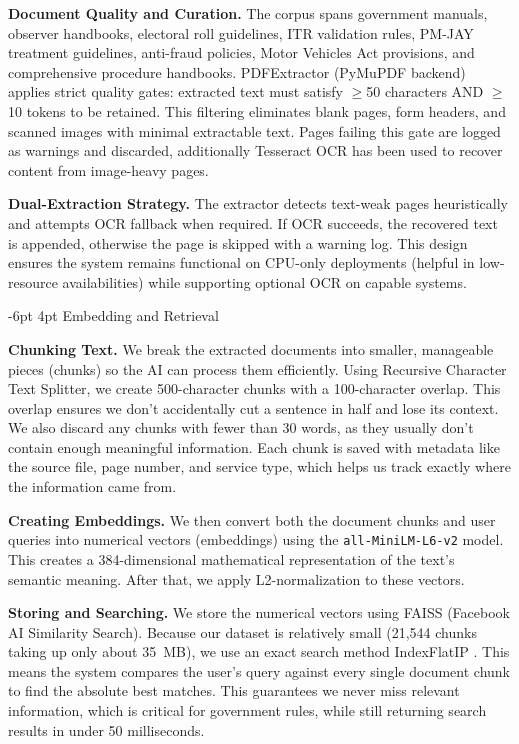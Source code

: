 \documentclass[10pt,twocolumn]{article}
\makeatletter
\renewcommand{\subsection}{\@startsection{subsection}{2}{\z@}%
  {-6pt \@plus -1pt \@minus -0.5pt}%
  {4pt \@plus 0.2pt}%
  {\normalfont\large\bfseries}}
\makeatother
\begin{document}
\noindent\textbf{Document Quality and Curation.}  The corpus spans government manuals, observer
handbooks, electoral roll guidelines, ITR validation rules, PM-JAY treatment guidelines, anti-fraud
policies, Motor Vehicles Act provisions, and comprehensive procedure handbooks. PDFExtractor
(PyMuPDF backend) applies strict quality gates: extracted text must satisfy $\geq$50 characters AND $\geq$10
tokens to be retained. This filtering eliminates blank pages, form headers, and scanned images with
minimal extractable text.  Pages failing this gate are logged as warnings and discarded, additionally Tesseract
OCR has been used to recover content from image-heavy pages.

\textbf{Dual-Extraction Strategy.}  The extractor detects text-weak pages heuristically and attempts
OCR fallback when required. If OCR succeeds, the
recovered text is appended, otherwise the page is skipped with a 
warning log. This design ensures the system remains functional on CPU-only deployments (helpful in low-resource
availabilities) while supporting optional OCR on capable systems.

\subsection{Embedding and Retrieval}

\textbf{Chunking Text.} We break the extracted documents into smaller, manageable pieces (chunks) so the AI can process them efficiently. Using Recursive Character Text Splitter, we create 500-character chunks with a 100-character overlap. This overlap ensures we don't accidentally cut a sentence in half and lose its context. We also discard any chunks with fewer than 30 words, as they usually don't contain enough meaningful information. Each chunk is saved with metadata like the source file, page number, and service type, which helps us track exactly where the information came from.

\textbf{Creating Embeddings.} We then convert both the document chunks and user queries into numerical vectors (embeddings) using the \texttt{all-MiniLM-L6-v2} model. This creates a 384-dimensional mathematical representation of the text's semantic meaning. After that, we apply L2-normalization to these vectors. 

\textbf{Storing and Searching.} We store the numerical vectors using FAISS (Facebook AI Similarity Search). Because our dataset is relatively small (21,544 chunks taking up only about 35~MB), we use an exact search method IndexFlatIP . This means the system compares the user's query against every single document chunk to find the absolute best matches. This guarantees we never miss relevant information, which is critical for government rules, while still returning search results in under 50 milliseconds.
\end{document}
